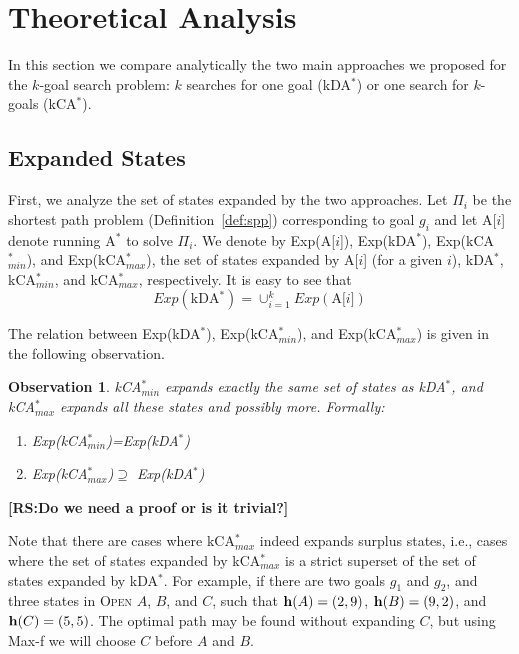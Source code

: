 \documentclass{aicom2e}
\newtheorem{observation}{Observation}
\newcommand{\kgs}{$k$-goal search}
\newcommand{\astar}{A$^*$}
\newcommand{\kastar}{kCA$^*$}
\newcommand{\kastarmin}{kCA$^*_{min}$}
\newcommand{\kastarmax}{kCA$^*_{max}$}
\newcommand{\kxastar}{kDA$^*$}
\newcommand{\astari}[1]{A[$#1$]}
\newcommand{\maxf}{Max-f}
\newcommand{\open}{\textsc{Open}}
\newcommand{\roni}[1]{\textbf{[RS:#1]}}
\begin{document}
\section{Theoretical Analysis}
In this section we compare analytically the two main approaches we proposed for the \kgs{} problem: $k$ searches for one goal (\kxastar{}) or one search for $k$-goals (\kastar{}).
\subsection{Expanded States}
First, we analyze the set of states expanded by the two approaches. Let $\Pi_i$ be the shortest path problem (Definition~\ref{def:spp}) corresponding to goal $g_i$ and let \astari{i} denote running \astar{} to solve $\Pi_i$.
We denote by Exp(\astari{i}), Exp(\kxastar{}), Exp(\kastarmin), and Exp(\kastarmax),
the set of states expanded by \astari{i} (for a given $i$), \kxastar{}, \kastarmin, and \kastarmax{}, respectively. It is easy to see that
\[ Exp(\text{\kxastar{}})=\cup_{i=1}^k Exp(\text{\astari{i}}) \]

The relation between Exp(\kxastar{}), Exp(\kastarmin), and Exp(\kastarmax) is given in the following observation.
\begin{observation}
    \kastarmin{} expands exactly the same set of states as \kxastar{},
    and \kastarmax{} expands all these states and possibly more. Formally:
    \begin{enumerate}
        \item Exp(\kastarmin{})=Exp(\kxastar{})
        \item Exp(\kastarmax{})$\supseteq$ Exp(\kxastar{})
    \end{enumerate}
\label{obs:expandedStates}
\end{observation}
\roni{Do we need a proof or is it trivial?}

Note that there are cases where \kastarmax{} indeed expands surplus states, i.e., cases where the set of states expanded by \kastarmax{} is a strict superset of the set of states expanded by \kxastar{}.
For example, if there are two goals $g_1$ and $g_2$, and three states in \open{} $A$, $B$, and $C$,
such that ${\bf h}(A)=(2,9)$, ${\bf h}(B)=(9,2)$, and ${\bf h}(C)=(5,5)$. The optimal path may be found without expanding $C$,
but using \maxf{} we will choose $C$ before $A$ and $B$.
\end{document}
